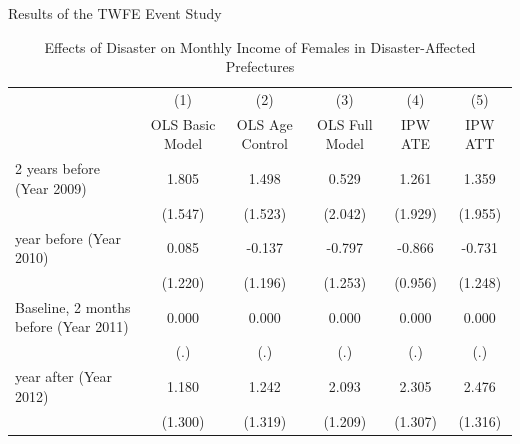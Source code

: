 \documentclass[serif, aspectratio=169]{beamer}
\begin{document}
\begin{frame}


Results of the TWFE Event Study

\vspace{-0.3cm}


\begin{table}[htbp]
\centering
\caption{Effects of Disaster on Monthly Income of Females in Disaster-Affected Prefectures}

\vspace{-0.1cm}


\begin{tabular}{@{\extracolsep{5pt}}lccccc}
            &\multicolumn{1}{c}{(1)}&\multicolumn{1}{c}{(2)}&\multicolumn{1}{c}{(3)}&\multicolumn{1}{c}{(4)}&\multicolumn{1}{c}{(5)}\\
            &\multicolumn{1}{c}{OLS Basic Model}&\multicolumn{1}{c}{OLS Age Control}&\multicolumn{1}{c}{OLS Full Model}&\multicolumn{1}{c}{IPW ATE}&\multicolumn{1}{c}{IPW ATT}\\
\midrule
2 years before (Year 2009)&       1.805         &       1.498         &       0.529         &       1.261         &       1.359         \\
            &     (1.547)         &     (1.523)         &     (2.042)         &     (1.929)         &     (1.955)         \\
\addlinespace
1 year before (Year 2010)&       0.085         &      -0.137         &      -0.797         &      -0.866         &      -0.731         \\
            &     (1.220)         &     (1.196)         &     (1.253)         &     (0.956)         &     (1.248)         \\
\addlinespace
Baseline, 2 months before (Year 2011)&       0.000         &       0.000         &       0.000         &       0.000         &       0.000         \\
            &         (.)         &         (.)         &         (.)         &         (.)         &         (.)         \\
\addlinespace
1 year after (Year 2012)&       1.180         &       1.242         &       2.093\sym{*}  &       2.305\sym{*}  &       2.476\sym{*}  \\
            &     (1.300)         &     (1.319)         &     (1.209)         &     (1.307)         &     (1.316)         \\

\end{tabular}
\end{table}
\end{frame}
\end{document}
